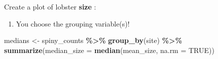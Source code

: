 \documentclass[
]{article}
\newenvironment{Shaded}{\begin{snugshade}}{\end{snugshade}}
\newcommand{\AttributeTok}[1]{\textcolor[rgb]{0.13,0.29,0.53}{#1}}
\newcommand{\ConstantTok}[1]{\textcolor[rgb]{0.56,0.35,0.01}{#1}}
\newcommand{\FunctionTok}[1]{\textcolor[rgb]{0.13,0.29,0.53}{\textbf{#1}}}
\newcommand{\NormalTok}[1]{#1}
\newcommand{\OtherTok}[1]{\textcolor[rgb]{0.56,0.35,0.01}{#1}}
\newcommand{\SpecialCharTok}[1]{\textcolor[rgb]{0.81,0.36,0.00}{\textbf{#1}}}
\providecommand{\tightlist}{%
  \setlength{\itemsep}{0pt}\setlength{\parskip}{0pt}}
\begin{document}
Create a plot of lobster \textbf{size} :

\begin{enumerate}
\def\labelenumi{\arabic{enumi})}
\setcounter{enumi}{3}
\tightlist
\item
  You choose the grouping variable(s)!
\end{enumerate}

\begin{Shaded}
\begin{Highlighting}[]
\NormalTok{medians }\OtherTok{\textless{}{-}}\NormalTok{ spiny\_counts }\SpecialCharTok{\%\textgreater{}\%}
  \FunctionTok{group\_by}\NormalTok{(site) }\SpecialCharTok{\%\textgreater{}\%}
  \FunctionTok{summarize}\NormalTok{(}\AttributeTok{median\_size =} \FunctionTok{median}\NormalTok{(mean\_size, }\AttributeTok{na.rm =} \ConstantTok{TRUE}\NormalTok{))}


\end{Highlighting}
\end{Shaded}
\end{document}
